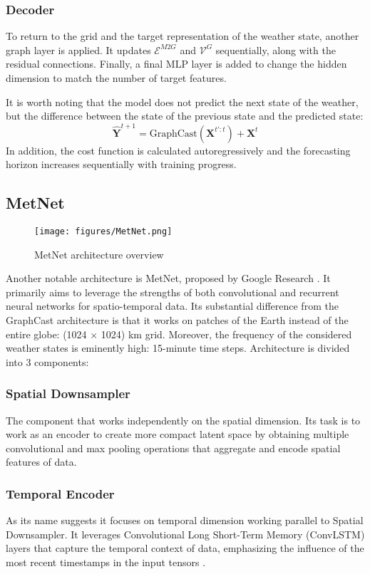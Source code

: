 \subsubsection{Decoder}
To return to the grid and the target representation of the weather state, another graph layer is applied. It updates $\mathcal{E}^{M2G}$ and $\mathcal{V}^G$ sequentially, along with the residual connections. Finally, a final MLP layer is added to change the hidden dimension to match the number of target features. 

It is worth noting that the model does not predict the next state of the weather, but the difference between the state of the previous state and the predicted state:
\[
    \hat{\mathbf{Y}}^{t+1} = \text{GraphCast}(\mathbf{X}^{t':t}) + \mathbf{X}^t
\]
In addition, the cost function is calculated autoregressively and the forecasting horizon increases sequentially with training progress.

\subsection{MetNet}
\begin{figure}
    \centering
    \texttt{[image: figures/MetNet.png]}
    \caption{MetNet architecture overview \cite{DBLP:journals/corr/abs-2003-12140}}
    \label{fig:metnet}
\end{figure}
Another notable architecture is MetNet, proposed by Google Research \cite{DBLP:journals/corr/abs-2003-12140}. It primarily aims to leverage the strengths of both convolutional and recurrent neural networks for spatio-temporal data. Its substantial difference from the GraphCast architecture is that it works on patches of the Earth instead of the entire globe: (1024 $\times$ 1024) km grid. Moreover, the frequency of the considered weather states is eminently high: 15-minute time steps. Architecture is divided into 3 components:
\subsubsection{Spatial Downsampler}
The component that works independently on the spatial dimension. Its task is to work as an encoder to create more compact latent space by obtaining multiple convolutional and max pooling operations that aggregate and encode spatial features of data.
\subsubsection{Temporal Encoder}
As its name suggests it focuses on temporal dimension working parallel to Spatial Downsampler. It leverages Convolutional Long Short-Term Memory (ConvLSTM) layers that capture the temporal context of data, emphasizing the influence of the most recent timestamps in the input tensors \cite{shi2015convolutional}. 
